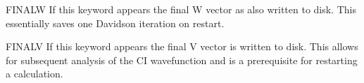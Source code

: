 \begin{keywordlist}
\item[FINALW]
If this keyword appears the final W vector as also written to disk. This
essentially saves one Davidson iteration on restart. 
\item[FINALV]
If this keyword appears the final V vector is written to disk. 
This allows for subsequent analysis of the CI wavefunction and is 
a prerequisite for restarting a calculation. 


\end{keywordlist}


